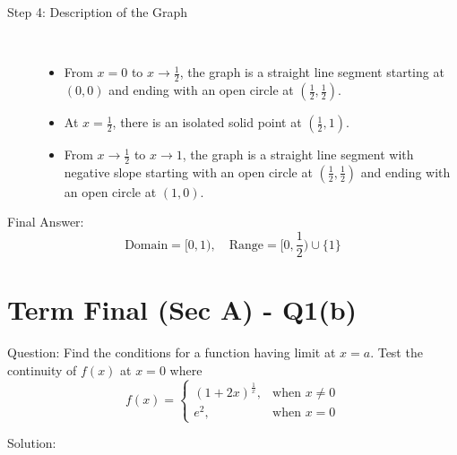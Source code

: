 \documentclass[11pt, a4paper]{article}
\begin{document}
\begin{description}
    \item[Step 4: Description of the Graph] \ 
    \begin{itemize}
        \item From $x = 0$ to $x \to \frac{1}{2}$, the graph is a straight line segment starting at $(0,0)$ and ending with an open circle at $(\frac{1}{2}, \frac{1}{2})$.
        \item At $x = \frac{1}{2}$, there is an isolated solid point at $(\frac{1}{2}, 1)$.
        \item From $x \to \frac{1}{2}$ to $x \to 1$, the graph is a straight line segment with negative slope starting with an open circle at $(\frac{1}{2}, \frac{1}{2})$ and ending with an open circle at $(1, 0)$.
    \end{itemize}
\end{description}

Final Answer:
\[ 
\boxed{\text{Domain} = [0, 1), \quad \text{Range} = [0, \frac{1}{2}) \cup \{1\}} 
\]



\section*{Term Final (Sec A) - Q1(b)}

Question:
Find the conditions for a function having limit at $x=a$. Test the continuity of $f(x)$ at $x=0$ where 
\[ 
f(x) = \begin{cases} 
(1+2x)^{\frac{1}{x}}, & \text{when } x \neq 0 \\ 
e^2, & \text{when } x = 0 
\end{cases} 
\]

Solution:
\end{document}
